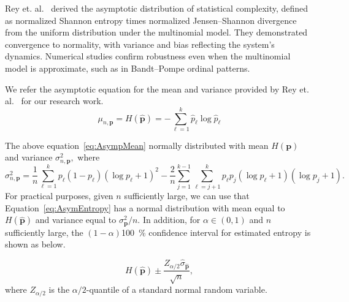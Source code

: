 Rey et. al.~\cite{Rey2025} derived the asymptotic distribution of statistical complexity, defined as normalized Shannon entropy times normalized Jensen–Shannon divergence from the uniform distribution under the multinomial model. They demonstrated convergence to normality, with variance and bias reflecting the system’s dynamics. Numerical studies confirm robustness even when the multinomial model is approximate, such as in Bandt–Pompe ordinal patterns. 

We refer the asymptotic equation for the mean and variance provided by Rey et. al.~\cite{Rey2025} for our research work.
\begin{equation}
	\mu_{n,\mathbf{p}}	= H(\widehat{\mathbf{p}})
	= -\sum_{\ell=1}^k \widehat{p}_\ell \log \widehat{p}_\ell 
	\label{eq:AsympMean}
\end{equation}  

The above equation~\eqref{eq:AsympMean} normally distributed with mean $H(\mathbf{p})$ and variance $\sigma^2_{n,\mathbf{p}},$ where
\begin{equation}
	\sigma^2_{n,\mathbf{p}}=\dfrac{1}{n}\sum_{\ell=1}^{k}p_\ell(1-p_\ell)(\log p_\ell+1)^2-\dfrac{2}{n}\sum_{j=1}^{k-1}\sum_{\ell=j+1}^{k}p_\ell p_j(\log p_\ell+1)(\log p_j+1).
\end{equation}
For practical purposes, given $n$ sufficiently large, we can use that 
Equation~\ref{eq:AsymEntropy} has a normal distribution with mean equal to $H(\widehat{\mathbf{p}})$ and variance equal to $\sigma^2_{\mathbf{p}}/n.$ In addition, for $\alpha \in (0,1)$ and $n$ sufficiently large, the $(1-\alpha)$\SI {100}{\percent} confidence interval for estimated entropy is shown as below.

\begin{equation}
	H(\widehat{\mathbf{p}})\pm \dfrac{Z_{\alpha/2}\widehat{\sigma}_{\widehat{\mathbf{p}}}}{\sqrt{n}},
	\label{eq:ConfidenceInterval}
\end{equation}
where $Z_{\alpha/2}$ is the $\alpha/2$-quantile of a standard normal random variable.


